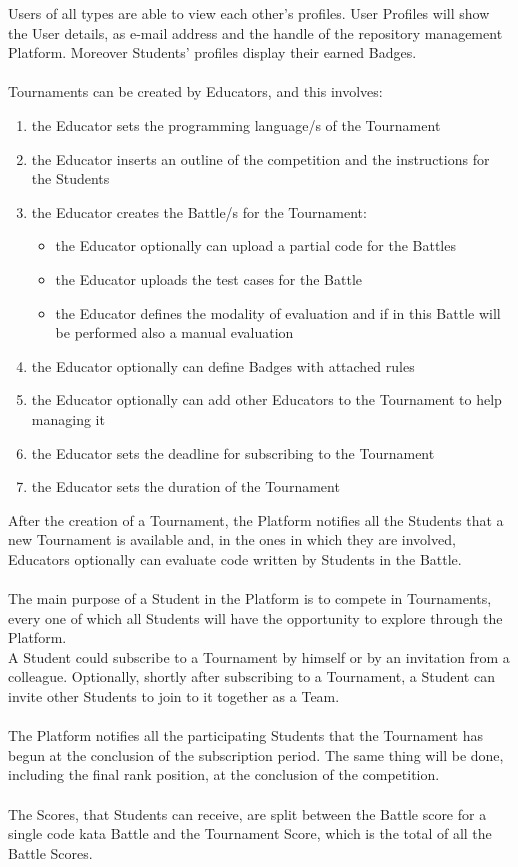 Users of all types are able to view each other's profiles. User Profiles will show the User details, as e-mail address and the handle of the repository management Platform. Moreover Students' profiles display their earned Badges.\\
\\
Tournaments can be created by Educators, and this involves:
\begin{enumerate}[label=$\bullet$]
    \item the Educator sets the programming language/s of the Tournament
    \item the Educator inserts an outline of the competition and the instructions for the Students
    \item the Educator creates the Battle/s for the Tournament:
    \begin{itemize}
        \item the Educator optionally can upload a partial code for the Battles
        \item the Educator uploads the test cases for the Battle
        \item the Educator defines the modality of evaluation and if in this Battle will be performed also a manual evaluation
    \end{itemize}
    \item the Educator optionally can define Badges with attached rules
    \item the Educator optionally can add other Educators to the Tournament to help managing it
    \item the Educator sets the deadline for subscribing to the Tournament
    \item the Educator sets the duration of the Tournament
\end{enumerate}
After the creation of a Tournament, the Platform notifies all the Students that a new Tournament is available and, in the ones in which they are involved, Educators optionally can evaluate code written by Students in the Battle.
\\
\\
The main purpose of a Student in the Platform is to compete in Tournaments, every one of which all Students will have the opportunity to explore through the Platform. \\

A Student could subscribe to a Tournament by himself or by an invitation from a colleague. Optionally, shortly after subscribing to a Tournament, a Student can invite other Students to join to it together as a Team.\\
\\
The Platform notifies all the participating Students that the Tournament has begun at the conclusion of the subscription period. The same thing will be done, including the final rank position, at the conclusion of the competition.\\
\\
The Scores, that Students can receive, are split between the Battle score for a single code kata Battle and the Tournament Score, which is the total of all the Battle Scores.

